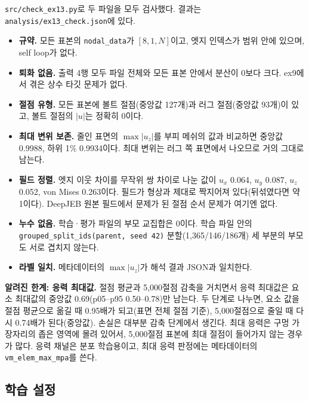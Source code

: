 \documentclass[11pt]{article}
\newcommand{\UZRET}{0.9988}
\newcommand{\UZRETPONE}{0.9934}
\newcommand{\VMRET}{0.69}
\newcommand{\VMRETLO}{0.50}
\newcommand{\VMRETHI}{0.78}
\newcommand{\NBOLT}{127}
\newcommand{\NLUG}{93}
\newcommand{\SMUX}{0.064}
\newcommand{\SMUY}{0.087}
\newcommand{\SMUZ}{0.052}
\newcommand{\SMVM}{0.263}
\newcommand{\GSPLIT}{1,365/146/186개}
\newcommand{\VMNODAL}{0.95}
\newcommand{\VMSMALL}{0.74}
\begin{document}
\texttt{src/check\_ex13.py}로 두 파일을 모두 검사했다. 결과는
\texttt{analysis/ex13\_check.json}에 있다.
\begin{itemize}
\item \textbf{규약.} 모든 표본의 \texttt{nodal\_data}가 $[8,1,N]$이고, 엣지 인덱스가 범위 안에
      있으며, self loop가 없다.
\item \textbf{퇴화 없음.} 출력 4행 모두 파일 전체와 모든 표본 안에서 분산이 0보다 크다.
      ex9에서 겪은 상수 타깃 문제가 없다.
\item \textbf{절점 유형.} 모든 표본에 볼트 절점(중앙값 \NBOLT{}개)과 러그 절점(중앙값
      \NLUG{}개)이 있고, 볼트 절점의 $|u|$는 정확히 0이다.
\item \textbf{최대 변위 보존.} 줄인 표면의 $\max|u_z|$를 부피 메쉬의 값과 비교하면 중앙값
      \UZRET{}, 하위 1\% \UZRETPONE{}이다. 최대 변위는 러그 쪽 표면에서 나오므로 거의 그대로 남는다.
\item \textbf{필드 정렬.} 엣지 이웃 차이를 무작위 쌍 차이로 나눈 값이 $u_x$ \SMUX{},
      $u_y$ \SMUY{}, $u_z$ \SMUZ{}, von Mises \SMVM{}이다. 필드가 형상과 제대로 짝지어져
      있다(뒤섞였다면 약 1이다). DeepJEB 원본 필드에서 문제가 된 절점 순서 문제가 여기엔 없다.
\item \textbf{누수 없음.} 학습·평가 파일의 부모 교집합은 0이다. 학습 파일 안의
      \texttt{grouped\_split\_ids(parent, seed 42)} 분할(\GSPLIT{}) 세 부분의 부모도 서로 겹치지 않는다.
\item \textbf{라벨 일치.} 메타데이터의 $\max|u_z|$가 해석 결과 JSON과 일치한다.
\end{itemize}

\noindent\textbf{알려진 한계: 응력 최대값.} 절점 평균과 5,000절점 감축을 거치면서
응력 최대값은 요소 최대값의 중앙값 \VMRET{}(p05--p95 \VMRETLO--\VMRETHI)만 남는다.
두 단계로 나누면, 요소 값을 절점 평균으로 옮길 때 \VMNODAL{}배가 되고(표면 전체 절점 기준),
5,000절점으로 줄일 때 다시 \VMSMALL{}배가 된다(중앙값). 손실은 대부분 감축 단계에서 생긴다.
최대 응력은 구멍 가장자리의 좁은 영역에 몰려 있어서, 5,000절점 표본에
최대 절점이 들어가지 않는 경우가 많다. 응력 채널은 분포 학습용이고, 최대 응력 판정에는
메타데이터의 \texttt{vm\_elem\_max\_mpa}를 쓴다.

\subsection{학습 설정}
\end{document}
